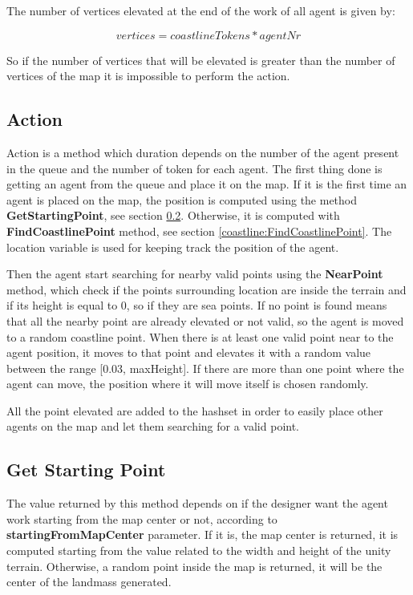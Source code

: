 \documentclass[12pt]{article}
\begin{document}
    The number of vertices elevated at the end of the work of all agent is given by:

    \begin{equation}
        vertices = coastlineTokens * agentNr
    \end{equation}

    \noindent
    So if the number of vertices that will be elevated is greater than the number of vertices of the map it is impossible to perform the action.

    \subsection{Action}
    Action is a method which duration depends on the number of the agent present in the queue and the number of token for each agent. The first thing done is getting an agent
    from the queue and place it on the map. If it is the first time an agent is placed on the map, the position is computed using the method \textbf{GetStartingPoint}, see 
    section \ref{coastline:StartingPoint}. Otherwise, it is computed with \textbf{FindCoastlinePoint} method, see section \ref{coastline:FindCoastlinePoint}. The location variable is used for keeping
    track the position of the agent.

    Then the agent start searching for nearby valid points using the \textbf{NearPoint} method, which check if the points surrounding location are inside the terrain and if its
    height is equal to 0, so if they are sea points. If no point is found means that all the nearby point are already elevated or not valid,
    so the agent is moved to a random coastline point. When there is at least one valid point near to the agent position, it moves to that point and elevates it with a random
    value between the range [0.03, maxHeight]. If there are more than one point where the agent can move, the position where it will move itself is chosen randomly.

    All the point elevated are added to the hashset in order to easily place other agents on the map and let them searching for a valid point.

    \subsection{Get Starting Point} \label{coastline:StartingPoint}
    The value returned by this method depends on if the designer want the agent work starting from the map center or not, according to \textbf{startingFromMapCenter}
    parameter. If it is, the map center is returned, it is computed starting from the value related to the width and height of the unity terrain. Otherwise, a random
    point inside the map is returned, it will be the center of the landmass generated.
\end{document}
